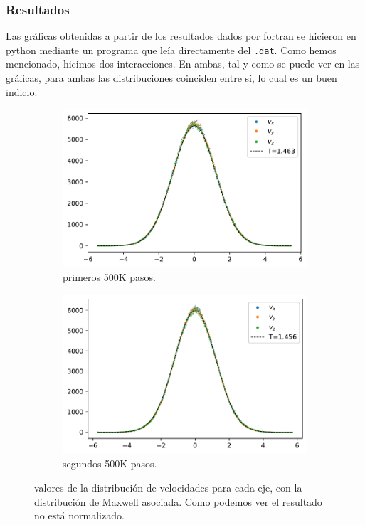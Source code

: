 \documentclass[11pt]{article} %
\begin{document}
\subsubsection{Resultados}

Las gráficas obtenidas a partir de los resultados dados por  fortran se hicieron en python mediante un programa que leía directamente del \texttt{.dat}. Como hemos mencionado, hicimos dos interacciones. En ambas, tal y como se puede ver en las gráficas, para ambas las distribuciones coinciden entre sí, lo cual es un buen indicio. 

\begin{figure}[h!] \centering
\begin{subfigure}{0.45\linewidth} \centering
	\includegraphics[width=1\textwidth]{../../Graficas/Velocidades_histo_1.pdf}
	\caption{primeros 500K pasos.}
	\label{Fig:03}
\end{subfigure}	
\begin{subfigure}{0.45\linewidth} \centering
\includegraphics[width=1\textwidth]{../../Graficas/Velocidades_histo_2.pdf}
\caption{segundos 500K pasos.}
\label{Fig:04}
\end{subfigure}	
\caption{valores de la distribución de velocidades para cada eje, con la distribución de Maxwell asociada. Como podemos ver el resultado no está normalizado.}
\end{figure}
\end{document}
